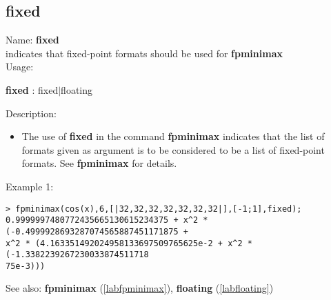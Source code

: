\subsection{fixed}
\label{labfixed}
\noindent Name: \textbf{fixed}\\
indicates that fixed-point formats should be used for \textbf{fpminimax}\\
\noindent Usage: 
\begin{center}
\textbf{fixed} : \textsf{fixed$|$floating}
\\ 
\end{center}
\noindent Description: \begin{itemize}

\item The use of \textbf{fixed} in the command \textbf{fpminimax} indicates that the list of
   formats given as argument is to be considered to be a list of fixed-point
   formats.
   See \textbf{fpminimax} for details.
\end{itemize}
\noindent Example 1: 
\begin{center}\begin{minipage}{15cm}\begin{Verbatim}[frame=single]
> fpminimax(cos(x),6,[|32,32,32,32,32,32,32|],[-1;1],fixed);
0.9999997480772435665130615234375 + x^2 * (-0.4999928693287074565887451171875 + 
x^2 * (4.163351492024958133697509765625e-2 + x^2 * (-1.3382239267230033874511718
75e-3)))
\end{Verbatim}
\end{minipage}\end{center}
See also: \textbf{fpminimax} (\ref{labfpminimax}), \textbf{floating} (\ref{labfloating})
